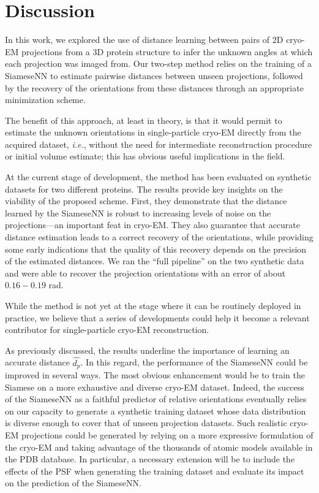 \section{Discussion}

 In this work, we explored the use of distance learning between pairs of 2D cryo-EM projections from a 3D protein structure to infer the unknown angles at which each projection was imaged from. Our two-step method relies on the training of a SiameseNN to estimate pairwise distances between unseen projections, followed by the recovery of the orientations from these distances through an appropriate minimization scheme. 

 The benefit of this approach, at least in theory, is that it would permit to estimate the unknown orientations in single-particle cryo-EM directly from the acquired dataset, \textit{i.e.}, without the need for intermediate reconstruction procedure or initial volume estimate; this has obvious useful implications in the field.  

 At the current stage of development, the method has been evaluated on synthetic datasets for two different proteins. The results provide key insights on the viability of the proposed scheme. First, they demonstrate that the distance learned by the SiameseNN is robust to increasing levels of noise on the projections---an important feat in cryo-EM. They also guarantee that accurate distance estimation leads to a correct recovery of the orientations, while providing some early indications that the quality of this recovery depends on the precision of the estimated distances. We ran the ``full pipeline'' on the two synthetic data and were able to recover the projection orientations with an error of about $0.16-0.19$ rad. 

 While the method is not yet at the stage where it can be routinely deployed in practice, we believe that a series of developments could help it become a relevant contributor for single-particle cryo-EM reconstruction. 

As previously discussed, the results underline the importance of learning an accurate distance $\widehat{d_p}$. In this regard, the performance of the SiameseNN could be improved in several ways. The most obvious enhancement would be to train the Siamese on a more exhaustive and diverse cryo-EM dataset. Indeed, the success of the SiameseNN as a faithful predictor of relative orientations eventually relies on our capacity to generate a synthetic training dataset whose data distribution is diverse enough to cover that of unseen projection datasets. Such realistic cryo-EM projections could be generated by relying on a more expressive formulation of the cryo-EM and taking advantage of the thousands of atomic models available in the PDB database. In particular, a necessary extension will be to include the effects of the PSF when generating the training dataset and evaluate its impact on the prediction of the SiameseNN. 

